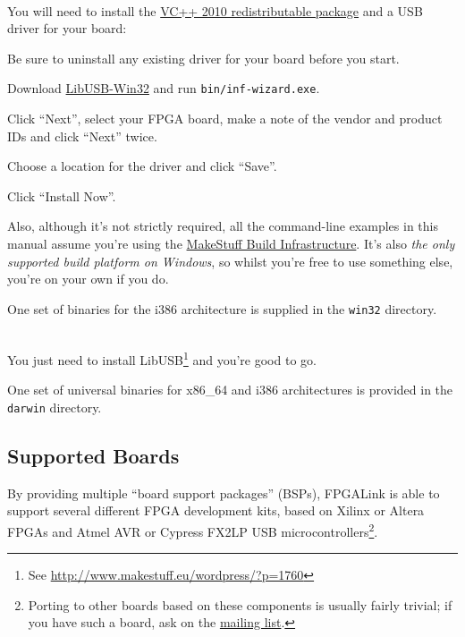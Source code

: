 \begin{desc}
  \item[\sffamily{Windows:}] \hfill \\
    You will need to install the \href{http://www.microsoft.com/downloads/info.aspx?na=41\&SrcFamilyId=A7B7A05E-6DE6-4D3A-A423-37BF0912DB84\&SrcDisplayLang=en\&u=http\%3a\%2f\%2fdownload.microsoft.com\%2fdownload\%2f5\%2fB\%2fC\%2f5BC5DBB3-652D-4DCE-B14A-475AB85EEF6E\%2fvcredist_x86.exe}{VC++ 2010 redistributable package} and a USB driver for your board:
    \begin{blobs}
      \item
        Be sure to uninstall any existing driver for your board before you start.
      \item
        Download \href{http://sourceforge.net/projects/libusb-win32/files/libusb-win32-releases/1.2.6.0/libusb-win32-bin-1.2.6.0.zip/download}{LibUSB-Win32} and run \texttt{bin/inf-wizard.exe}.
      \item
        Click ``Next'', select your FPGA board, make a note of the vendor and product IDs and click ``Next'' twice.
      \item
        Choose a location for the driver and click ``Save''.
      \item
        Click ``Install Now''.
    \end{blobs}
    Also, although it's not strictly required, all the command-line examples in this manual assume you're using the \href{http://www.makestuff.eu/wordpress/?page_id=1489}{MakeStuff Build Infrastructure}. It's also \textit{the only supported build platform on Windows}, so whilst you're free to use something else, you're on your own if you do.

    One set of binaries for the i386 architecture is supplied in the \texttt{win32} directory.
  \item[\sffamily{MacOSX:}] \hfill \\
    You just need to install LibUSB\footnote{See \url{http://www.makestuff.eu/wordpress/?p=1760}} and you're good to go.

    One set of universal binaries for x86\_64 and i386 architectures is provided in the \texttt{darwin} directory.
\end{desc}

\subsection{Supported Boards}
By providing multiple ``board support packages'' (BSPs), FPGALink is able to support several different FPGA development kits, based on Xilinx or Altera FPGAs and Atmel AVR or Cypress FX2LP USB microcontrollers\footnote{Porting to other boards based on these components is usually fairly trivial; if you have such a board, ask on the \href{http://groups.google.com/group/fpgalink-users}{mailing list}.}.

